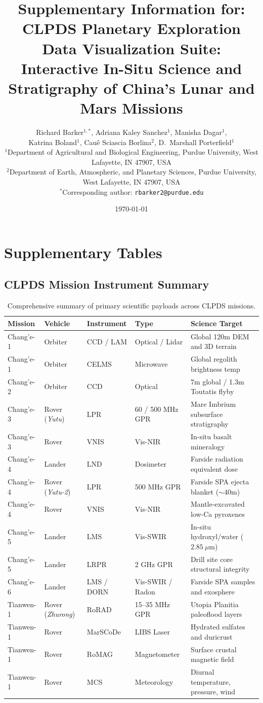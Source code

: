 \documentclass[11pt,letterpaper]{article}
\title{\textbf{Supplementary Information for:}\\
CLPDS Planetary Exploration Data Visualization Suite: Interactive In-Situ Science and Stratigraphy of China's Lunar and Mars Missions}
\author{
  Richard Barker$^{1,*}$, Adriana Kaley Sanchez$^1$, Manisha Dagar$^1$,\\
  Katrina Boland$^1$, Cau\^{e} Sciascia Borlina$^2$, D.~Marshall Porterfield$^1$\\
  \small $^1$Department of Agricultural and Biological Engineering, Purdue University, West Lafayette, IN 47907, USA\\
  \small $^2$Department of Earth, Atmospheric, and Planetary Sciences, Purdue University, West Lafayette, IN 47907, USA\\
  \small $^*$Corresponding author: \texttt{rbarker2@purdue.edu}
}
\date{\today}
\begin{document}
\maketitle

\tableofcontents
\newpage

\section{Supplementary Tables}

\subsection{CLPDS Mission Instrument Summary}
\begin{table}[h!]
\centering
\small
\begin{tabularx}{\textwidth}{llllX}
\toprule
\textbf{Mission} & \textbf{Vehicle} & \textbf{Instrument} & \textbf{Type} & \textbf{Science Target} \\
\midrule
Chang'e-1 & Orbiter & CCD / LAM & Optical / Lidar & Global 120m DEM and 3D terrain \\
Chang'e-1 & Orbiter & CELMS & Microwave & Global regolith brightness temp \\
Chang'e-2 & Orbiter & CCD & Optical & 7m global / 1.3m Toutatis flyby \\
Chang'e-3 & Rover (\textit{Yutu}) & LPR & 60 / 500 MHz GPR & Mare Imbrium subsurface stratigraphy \\
Chang'e-3 & Rover & VNIS & Vis-NIR & In-situ basalt mineralogy \\
Chang'e-4 & Lander & LND & Dosimeter & Farside radiation equivalent dose \\
Chang'e-4 & Rover (\textit{Yutu-2}) & LPR & 500 MHz GPR & Farside SPA ejecta blanket ($\sim 40$m) \\
Chang'e-4 & Rover & VNIS & Vis-NIR & Mantle-excavated low-Ca pyroxenes \\
Chang'e-5 & Lander & LMS & Vis-SWIR & In-situ hydroxyl/water ($2.85~\mu$m) \\
Chang'e-5 & Lander & LRPR & 2 GHz GPR & Drill site core structural integrity \\
Chang'e-6 & Lander & LMS / DORN & Vis-SWIR / Radon & Farside SPA samples and exosphere \\
Tianwen-1 & Rover (\textit{Zhurong}) & RoRAD & 15--35 MHz GPR & Utopia Planitia paleoflood layers \\
Tianwen-1 & Rover & MarSCoDe & LIBS Laser & Hydrated sulfates and duricrust \\
Tianwen-1 & Rover & RoMAG & Magnetometer & Surface crustal magnetic field \\
Tianwen-1 & Rover & MCS & Meteorology & Diurnal temperature, pressure, wind \\
\bottomrule
\end{tabularx}
\caption{Comprehensive summary of primary scientific payloads across CLPDS missions.}
\label{tab:instruments}
\end{table}
\end{document}
